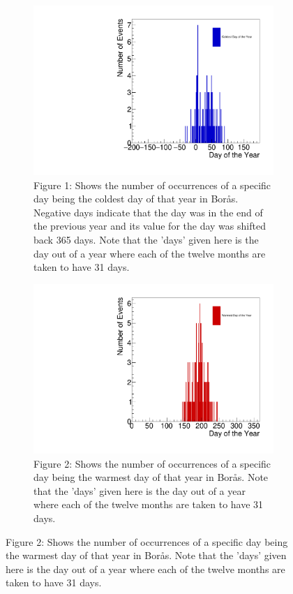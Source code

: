 \documentclass[a4, 12pt]{article}
\begin{document}
\begin{figure}[H]
\centering
\begin{subfigure}{.5\textwidth}
  \centering
  \captionsetup{width = 0.9\linewidth}
  \includegraphics[width=0.9\linewidth]{philipCold.pdf}
   \caption*{Figure 1: Shows the number of occurrences of a specific day being the coldest day of that year in Borås. Negative days indicate that the day was in the end of the previous year and its value for the day was shifted back 365 days. Note that the 'days' given here is the day out of a year where each of the twelve months are taken to have 31 days.
   }
\end{subfigure}\hfill
\begin{subfigure}{.5\textwidth}
  \centering
  \captionsetup{width = 0.9\linewidth}
  \includegraphics[width=0.9\linewidth]{philipHot.pdf}
  \caption*{Figure 2: Shows the number of occurrences of a specific day being the warmest day of that year in Borås. Note that the 'days' given here is the day out of a year where each of the twelve months are taken to have 31 days. \newline \newline \newline  \mbox{         }}
\end{subfigure}

\end{figure}
\end{document}
